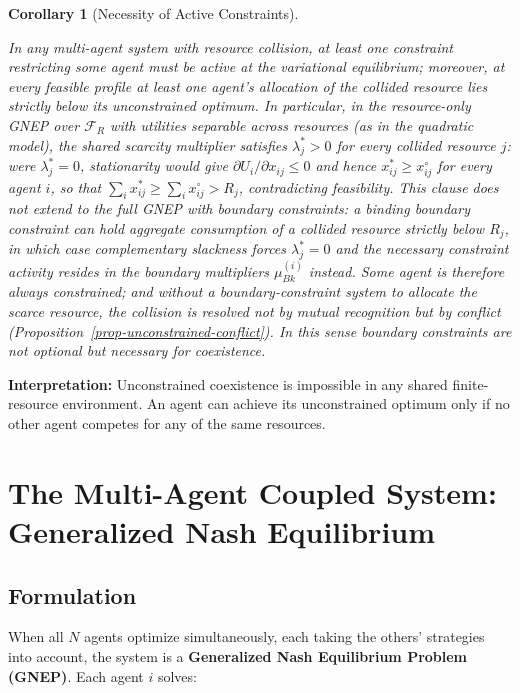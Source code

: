 \documentclass[11pt]{article}
\theoremstyle{plain}
\newtheorem{corollary}[theorem]{Corollary}
\theoremstyle{definition}
\theoremstyle{remark}
\let\origsection\section
\renewcommand{\section}{\needspace{12\baselineskip}\origsection}
\let\origsubsection\subsection
\renewcommand{\subsection}{\needspace{7\baselineskip}\origsubsection}
\begin{document}
\begin{corollary}[Necessity of Active Constraints]
\label{cor-necessity-active-constraints}

In any multi-agent system with resource collision, at least one constraint restricting some agent must be active at the variational equilibrium; moreover, at every feasible profile at least one agent's allocation of the collided resource lies strictly below its unconstrained optimum. In particular, in the resource-only GNEP over $\mathcal{F}_R$ with utilities separable across resources (as in the quadratic model), the shared scarcity multiplier satisfies $\lambda_j^* > 0$ for every collided resource $j$: were $\lambda_j^* = 0$, stationarity would give $\partial U_i / \partial x_{ij} \leq 0$ and hence $x_{ij}^* \geq x_{ij}^{\circ}$ for every agent $i$, so that $\sum_i x_{ij}^* \geq \sum_i x_{ij}^{\circ} > R_j$, contradicting feasibility. This clause does not extend to the full GNEP with boundary constraints: a binding boundary constraint can hold aggregate consumption of a collided resource strictly below $R_j$, in which case complementary slackness forces $\lambda_j^* = 0$ and the necessary constraint activity resides in the boundary multipliers $\mu_{Bk}^{(i)}$ instead. Some agent is therefore always constrained; and without a boundary-constraint system to allocate the scarce resource, the collision is resolved not by mutual recognition but by conflict (Proposition~\ref{prop-unconstrained-conflict}). In this sense boundary constraints are not optional but necessary for coexistence.
\end{corollary}

\textbf{Interpretation:} Unconstrained coexistence is impossible in any
shared finite-resource environment. An agent can achieve its
unconstrained optimum only if no other agent competes for any of the
same resources.

\section{The Multi-Agent Coupled System: Generalized Nash
Equilibrium}\label{the-multi-agent-coupled-system-generalized-nash-equilibrium}

\subsection{Formulation}\label{formulation-1}

When all \(N\) agents optimize simultaneously, each taking the others'
strategies into account, the system is a \textbf{Generalized Nash
Equilibrium Problem (GNEP)}. Each agent \(i\) solves:
\end{document}
